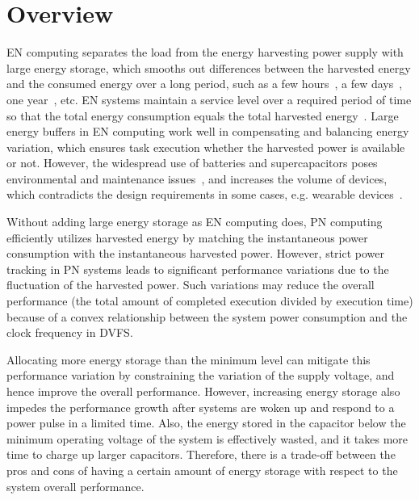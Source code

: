 \section{Overview}


EN computing separates the load from the energy harvesting power supply with large energy storage, which smooths out differences between the harvested energy and the consumed energy over a long period, such as a few hours~\cite{kansal2007power}, a few days~\cite{sharma2010cloudy}, one year~\cite{buchli2014dynamic}, etc. EN systems maintain a service level over a required period of time so that the total energy consumption equals the total harvested energy~\cite{kansal2007power}. Large energy buffers in EN computing work well in compensating and balancing energy variation, which ensures task execution whether the harvested power is available or not. However, the widespread use of batteries and supercapacitors poses environmental and maintenance issues~\cite{peng2012throughput, raghunathan2005design}, and increases the volume of devices, which contradicts the design requirements in some cases, e.g. wearable devices~\cite{mitcheson2010energy, acampora2013survey}.

Without adding large energy storage as EN computing does, PN computing efficiently utilizes harvested energy by matching the instantaneous power consumption with the instantaneous harvested power. However, strict power tracking in PN systems leads to significant performance variations due to the fluctuation of the harvested power. Such variations may reduce the overall performance (the total amount of completed execution divided by execution time) because of a convex relationship between the system power consumption and the clock frequency in DVFS.

Allocating more energy storage than the minimum level can mitigate this performance variation by constraining the variation of the supply voltage, and hence improve the overall performance. However, increasing energy storage also impedes the performance growth after systems are woken up and respond to a power pulse in a limited time. Also, the energy stored in the capacitor below the minimum operating voltage of the system is effectively wasted, and it takes more time to charge up larger capacitors. Therefore, there is a trade-off between the pros and cons of having a certain amount of energy storage with respect to the system overall performance. 

